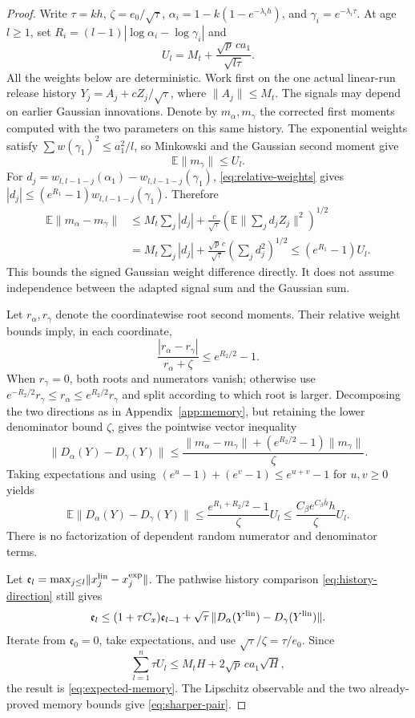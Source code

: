 \documentclass[a4paper,11pt]{article}
\theoremstyle{remark}
\newcommand{\E}{\mathbb E}
\newcommand{\norm}[1]{\lVert#1\rVert}
\begin{document}
\begin{proof}
Write $\tau=kh$, $\zeta=e_0/\sqrt\tau$,
$\alpha_i=1-k(1-e^{-\lambda_i h})$, and
$\gamma_i=e^{-\lambda_i\tau}$. At age $l\ge1$, set
$R_i=(l-1)|\log\alpha_i-\log\gamma_i|$ and
\[
 U_l=M_t+\frac{\sqrt p\,c a_1}{\sqrt{l\tau}}.
\]
All the weights below are deterministic. Work first on the one actual
linear-run release history $Y_j=A_j+cZ_j/\sqrt\tau$, where
$\norm{A_j}\le M_t$. The signals may depend on earlier Gaussian
innovations. Denote by $m_\alpha,m_\gamma$ the corrected first moments
computed with the two parameters on this same history. The exponential
weights satisfy $\sum w(\gamma_1)^2\le a_1^2/l$, so Minkowski and the
Gaussian second moment give
\[
 \E\norm{m_\gamma}\le U_l.
\]
For $d_j=w_{l,l-1-j}(\alpha_1)-w_{l,l-1-j}(\gamma_1)$,
\eqref{eq:relative-weights} gives
$|d_j|\le(e^{R_1}-1)w_{l,l-1-j}(\gamma_1)$. Therefore
\begin{align*}
 \E\norm{m_\alpha-m_\gamma}
 &\le M_t\sum_j|d_j|
    +\frac c{\sqrt\tau}\left(\E\norm{\sum_jd_jZ_j}^2\right)^{1/2}\\
 &=M_t\sum_j|d_j|+\frac{\sqrt p\,c}{\sqrt\tau}
                      \left(\sum_jd_j^2\right)^{1/2}
 \le(e^{R_1}-1)U_l.
\end{align*}
This bounds the signed Gaussian weight difference directly. It does not
assume independence between the adapted signal sum and the Gaussian sum.

Let $r_\alpha,r_\gamma$ denote the coordinatewise root second moments.
Their relative weight bounds imply, in each coordinate,
\[
 \frac{|r_\alpha-r_\gamma|}{r_\alpha+\zeta}
 \le e^{R_2/2}-1.
\]
When $r_\gamma=0$, both roots and numerators vanish; otherwise use
$e^{-R_2/2}r_\gamma\le r_\alpha\le e^{R_2/2}r_\gamma$ and split
according to which root is larger. Decomposing the two directions as
in Appendix~\ref{app:memory}, but retaining the lower denominator bound
$\zeta$, gives the pointwise vector inequality
\[
 \norm{D_\alpha(Y)-D_\gamma(Y)}
 \le\frac{\norm{m_\alpha-m_\gamma}
             +(e^{R_2/2}-1)\norm{m_\gamma}}{\zeta}.
\]
Taking expectations and using
$(e^u-1)+(e^v-1)\le e^{u+v}-1$ for $u,v\ge0$ yields
\[
 \E\norm{D_\alpha(Y)-D_\gamma(Y)}
 \le\frac{e^{R_1+R_2/2}-1}{\zeta}U_l
 \le\frac{C_\beta e^{C_\beta\bar h}h}{\zeta}U_l.
\]
There is no factorization of dependent random numerator and denominator
terms.

Let $\mathfrak e_l=\max_{j\le l}\norm{x_j^{\rm lin}-x_j^{\rm exp}}$.
The pathwise history comparison \eqref{eq:history-direction} still gives
\[
 \mathfrak e_l\le(1+\tau C_x)\mathfrak e_{l-1}
       +\sqrt\tau\,\norm{D_\alpha(Y^{\rm lin})
                                -D_\gamma(Y^{\rm lin})}.
\]
Iterate from $\mathfrak e_0=0$, take expectations, and use
$\sqrt\tau/\zeta=\tau/e_0$. Since
\[
 \sum_{l=1}^n\tau U_l
 \le M_tH+2\sqrt p\,c a_1\sqrt H,
\]
the result is \eqref{eq:expected-memory}. The Lipschitz observable and the
two already-proved memory bounds give \eqref{eq:sharper-pair}.
\end{proof}
\end{document}
